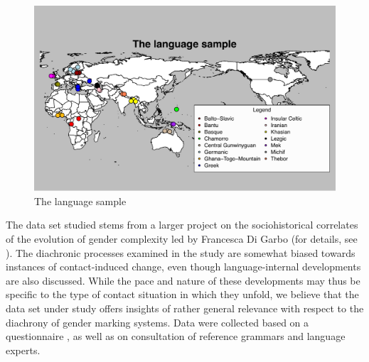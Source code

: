 \documentclass[output=collectionpaper]{langsci/langscibook}
\begin{document}
\begin{figure}
\includegraphics[height=.4\textheight]{figures/11/VolumeSample1}
\caption{The language sample}
\label{fig:dgm:sample}
\end{figure}

The data set studied stems from a larger project on the sociohistorical correlates of the evolution of gender complexity led by Francesca Di Garbo (for details, see \citet{DiGarboinpreparation}). The diachronic processes examined in the study are somewhat biased towards instances of contact-induced change, even though language-internal developments are also discussed. While the pace and nature of these developments may thus be specific to the type of contact situation in which they unfold, we believe that the data set under study offers insights of rather general relevance with respect to the diachrony of gender marking systems. Data were collected based on a questionnaire \citep{DiGarbo2015a}, as well as on consultation of reference grammars and language experts.
\end{document}
